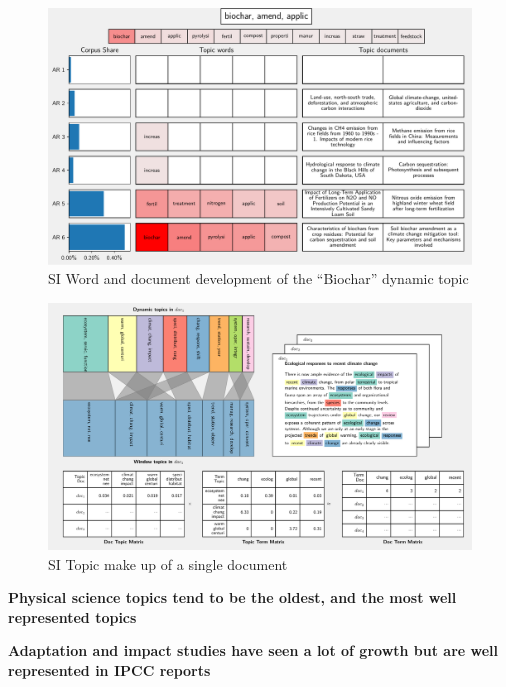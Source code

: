 \documentclass{article}
\begin{document}
\begin{figure}
	\begin{center}
		\includegraphics[width=1\linewidth]{plots/single_topic_3_11020.pdf}
		\caption{SI Word and document development of the ``Biochar'' dynamic topic}
		\label{}
	\end{center}
\end{figure}


\begin{figure}
	\begin{center}
		\includegraphics[width=1\linewidth]{plots/single_doc_3_536594.pdf}
		\caption{SI Topic make up of a single document}
		\label{}
	\end{center}
\end{figure}

\bigskip
\noindent\textbf{Physical science topics tend to be the oldest, and the most well represented topics}

\bigskip
\noindent\textbf{Adaptation and impact studies have seen a lot of growth but are well represented in IPCC reports}
\end{document}
